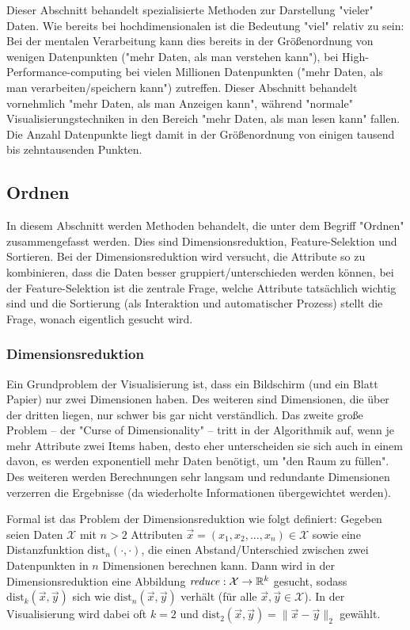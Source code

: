 	Dieser Abschnitt behandelt spezialisierte Methoden zur Darstellung "vieler" Daten. Wie bereits bei hochdimensionalen ist die Bedeutung "viel" relativ zu sein: Bei der mentalen Verarbeitung kann dies bereits in der Größenordnung von wenigen Datenpunkten ("mehr Daten, als man verstehen kann"), bei High-Performance-computing bei vielen Millionen Datenpunkten ("mehr Daten, als man verarbeiten/speichern kann") zutreffen. Dieser Abschnitt behandelt vornehmlich "mehr Daten, als man Anzeigen kann", während "normale" Visualisierungstechniken in den Bereich "mehr Daten, als man lesen kann" fallen. Die Anzahl Datenpunkte liegt damit in der Größenordnung von einigen tausend bis zehntausenden Punkten.

	\subsection{Ordnen}
		In diesem Abschnitt werden Methoden behandelt, die unter dem Begriff "Ordnen" zusammengefasst werden. Dies sind \bspw Dimensionsreduktion, Feature-Selektion und Sortieren. Bei der Dimensionsreduktion wird versucht, die Attribute so zu kombinieren, dass die Daten besser gruppiert/unterschieden werden können, bei der Feature-Selektion ist die zentrale Frage, welche Attribute tatsächlich wichtig sind und die Sortierung (als Interaktion und automatischer Prozess) stellt die Frage, wonach eigentlich gesucht wird.

		\subsubsection{Dimensionsreduktion}
			\label{subsubsec:dimred}

			Ein Grundproblem der Visualisierung ist, dass ein Bildschirm (und ein Blatt Papier) nur zwei Dimensionen haben. Des weiteren sind Dimensionen, die über der dritten liegen, nur schwer bis gar nicht verständlich. Das zweite große Problem -- der "Curse of Dimensionality" -- tritt in der Algorithmik auf, wenn je mehr Attribute zwei Items haben, desto eher unterscheiden sie sich auch in einem davon, \dh es werden exponentiell mehr Daten benötigt, um "den Raum zu füllen". Des weiteren werden Berechnungen sehr langsam und redundante Dimensionen verzerren die Ergebnisse (da wiederholte Informationen übergewichtet werden).

			Formal ist das Problem der Dimensionsreduktion wie folgt definiert: Gegeben seien Daten \( \mathcal{X} \) mit \(n > 2\) Attributen \( \vec{x} = (x_1, x_2, \dots, x_n) \in \mathcal{X} \) sowie eine Distanzfunktion \( \mathrm{dist}_n(\cdot, \cdot) \), die einen Abstand/Unterschied zwischen zwei Datenpunkten in \(n\) Dimensionen berechnen kann. Dann wird in der Dimensionsreduktion eine Abbildung \( \mathit{reduce} : \mathcal{X} \to \mathbb{R}^k \) gesucht, sodass \( \mathrm{dist}_k(\vec{x}, \vec{y}) \) sich wie \( \mathrm{dist}_n(\vec{x}, \vec{y}) \) verhält (für alle \( \vec{x}, \vec{y} \in \mathcal{X} \)). In der Visualisierung wird dabei oft \( k = 2 \) und \( \mathrm{dist}_2(\vec{x}, \vec{y}) = \lVert \vec{x} - \vec{y} \rVert_2 \) gewählt.

